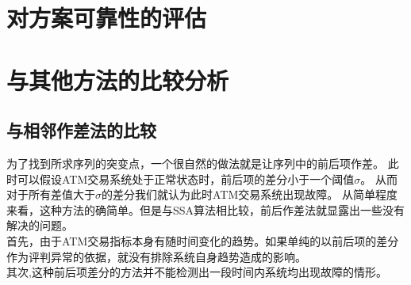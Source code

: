 \documentclass[a4paper]{article}
\begin{document}
\section{对方案可靠性的评估}
\section{与其他方法的比较分析}
\subsection{与相邻作差法的比较}
\indent 为了找到所求序列的突变点，一个很自然的做法就是让序列中的前后项作差。
此时可以假设ATM交易系统处于正常状态时，前后项的差分小于一个阈值$\sigma$。
从而对于所有差值大于$\sigma$的差分我们就认为此时ATM交易系统出现故障。
从简单程度来看，这种方法的确简单。但是与SSA算法相比较，前后作差法就显露出一些没有解决的问题。\\
\indent 首先，由于ATM交易指标本身有随时间变化的趋势。如果单纯的以前后项的差分作为评判异常的依据，就没有排除系统自身趋势造成的影响。\\
\indent 其次,这种前后项差分的方法并不能检测出一段时间内系统均出现故障的情形。
\end{document}
